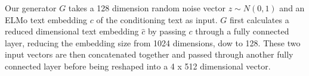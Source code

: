 Our generator $G$ takes a 128 dimension random noise vector $z \sim N(0, 1)$ and an ELMo text embedding $c$ of the conditioning text as input. $G$ first calculates a reduced dimensional text embedding $\hat{c}$ by passing $c$ through a fully connected layer, reducing the embedding size from 1024 dimensions, dow to 128. These two input vectors are then concatenated together and passed through another fully connected layer before being reshaped into a 4 x 512 dimensional vector.